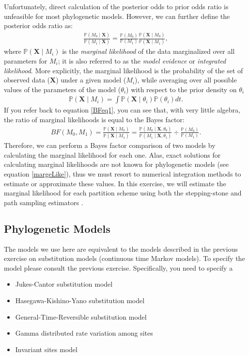 Unfortunately, direct calculation of the posterior odds to prior odds ratio is unfeasible for most phylogenetic models. However, we can further define the posterior odds ratio as:
\begin{align*}
\frac{\mathbb{P}(M_0 \mid \mathbf X)}{\mathbb{P}(M_1 \mid \mathbf X)} = \frac{\mathbb{P}(M_0)}{\mathbb{P}(M_1)} \frac{\mathbb{P}(\mathbf X \mid M_0)}{\mathbb{P}(\mathbf X \mid M_1)},
\end{align*}
where $\mathbb{P}(\mathbf X \mid M_i)$ is the \textit{marginal likelihood} of the data marginalized over all parameters for $M_i$; it is also referred to as the \textit{model evidence} or \textit{integrated likelihood}.
More explicitly, the marginal likelihood is the probability of the set of observed data ($\mathbf X$) under a given model ($M_i$), while averaging over all possible values of the parameters of the model ($\theta_i$) with respect to the prior density on $\theta_i$
\begin{align}\label{margeLike}
\mathbb{P}(\mathbf X \mid M_i) = \int \mathbb{P}(\mathbf X \mid \theta_i) \mathbb{P}(\theta_i)dt.
\end{align}
If you refer back to equation \ref{BFeq1}, you can see that, with very little algebra, the ratio of marginal likelihoods is equal to the Bayes factor:
\begin{align}\label{bfFormula}
BF(M_0,M_1) = \frac{\mathbb{P}(\mathbf X \mid M_0)}{\mathbb{P}(\mathbf X \mid M_1)} = \frac{\mathbb{P}(M_0 \mid \mathbf X, \theta_0)}{\mathbb{P}(M_1 \mid \mathbf X, \theta_1)} \div \frac{\mathbb{P}(M_0)}{\mathbb{P}(M_1)}. 
\end{align}
Therefore, we can perform a Bayes factor comparison of two models by calculating the marginal likelihood for each one. %
Alas, exact solutions for calculating marginal likelihoods are not known for phylogenetic models (see equation \ref{margeLike}), thus we must resort to numerical integration methods to estimate or approximate these values. 
In this exercise, we will estimate the marginal likelihood for each partition scheme
using both the stepping-stone \citep{Xie2011,Fan2011} and path sampling estimators \citep{Lartillot2006, Baele2012}. 



\bigskip
\subsection{Phylogenetic Models}\label{secUnif} 

The models we use here are equivalent to the models described in the previous exercise on substitution models (continuous time Markov models).
To specify the model please consult the previous exercise. Specifically, you need to specify a 
\begin{itemize}
\item Jukes-Cantor substitution model
\item Hasegawa-Kishino-Yano substitution model
\item General-Time-Reversible substitution model
\item Gamma distributed rate variation among sites
\item Invariant sites model
\end{itemize}


